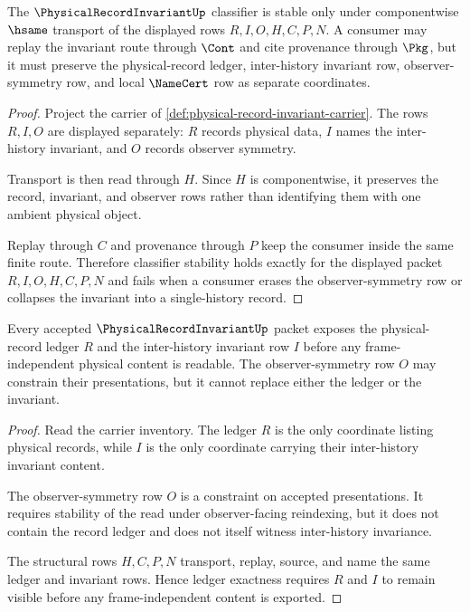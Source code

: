 \begin{theorem}
\label{thm:physical-record-invariant-classifier-stability}
The $\PhysicalRecordInvariantUp$ classifier is stable only under componentwise $\hsame$ transport of the displayed rows $R,I,O,H,C,P,N$. A consumer may replay the invariant route through $\Cont$ and cite provenance through $\Pkg$, but it must preserve the physical-record ledger, inter-history invariant row, observer-symmetry row, and local $\NameCert$ row as separate coordinates.
\end{theorem}
\begin{proof}
Project the carrier of \autoref{def:physical-record-invariant-carrier}. The rows $R,I,O$ are displayed separately: $R$ records physical data, $I$ names the inter-history invariant, and $O$ records observer symmetry.

Transport is then read through $H$. Since $H$ is componentwise, it preserves the record, invariant, and observer rows rather than identifying them with one ambient physical object.

Replay through $C$ and provenance through $P$ keep the consumer inside the same finite route. Therefore classifier stability holds exactly for the displayed packet $R,I,O,H,C,P,N$ and fails when a consumer erases the observer-symmetry row or collapses the invariant into a single-history record.
\end{proof}

\begin{theorem}
\label{thm:physical-record-invariant-ledger-exactness}
Every accepted $\PhysicalRecordInvariantUp$ packet exposes the physical-record ledger $R$ and the inter-history invariant row $I$ before any frame-independent physical content is readable. The observer-symmetry row $O$ may constrain their presentations, but it cannot replace either the ledger or the invariant.
\end{theorem}
\begin{proof}
Read the carrier inventory. The ledger $R$ is the only coordinate listing physical records, while $I$ is the only coordinate carrying their inter-history invariant content.

The observer-symmetry row $O$ is a constraint on accepted presentations. It requires stability of the read under observer-facing reindexing, but it does not contain the record ledger and does not itself witness inter-history invariance.

The structural rows $H,C,P,N$ transport, replay, source, and name the same ledger and invariant rows. Hence ledger exactness requires $R$ and $I$ to remain visible before any frame-independent content is exported.
\end{proof}


